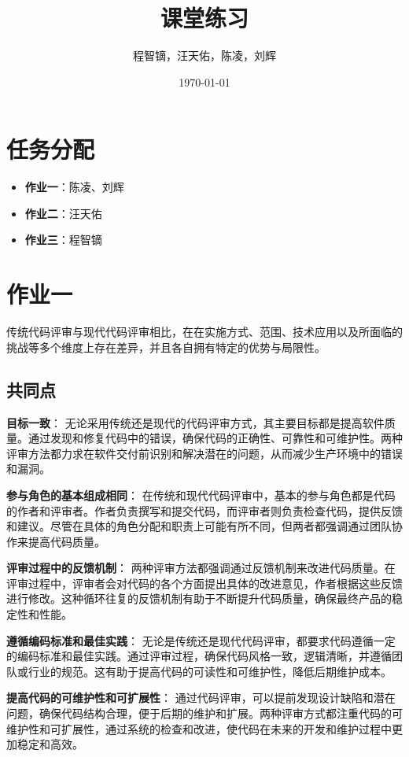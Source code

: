 \documentclass{article}
\title{课堂练习}
\author{程智镝，汪天佑，陈凌，刘辉}
\date{\today}
\begin{document}
\maketitle
\section*{任务分配}
\begin{itemize}
    \item \textbf{作业一}：陈凌、刘辉
    \item \textbf{作业二}：汪天佑
    \item \textbf{作业三}：程智镝
\end{itemize}


\section{作业一}
传统代码评审与现代代码评审相比，在在实施方式、范围、技术应用以及所面临的挑战等多个维度上存在差异，并且各自拥有特定的优势与局限性。

\subsection{共同点}

\textbf{目标一致}：
无论采用传统还是现代的代码评审方式，其主要目标都是提高软件质量。通过发现和修复代码中的错误，确保代码的正确性、可靠性和可维护性。两种评审方法都力求在软件交付前识别和解决潜在的问题，从而减少生产环境中的错误和漏洞。

\textbf{参与角色的基本组成相同}：
在传统和现代代码评审中，基本的参与角色都是代码的作者和评审者。作者负责撰写和提交代码，而评审者则负责检查代码，提供反馈和建议。尽管在具体的角色分配和职责上可能有所不同，但两者都强调通过团队协作来提高代码质量。

\textbf{评审过程中的反馈机制}：
两种评审方法都强调通过反馈机制来改进代码质量。在评审过程中，评审者会对代码的各个方面提出具体的改进意见，作者根据这些反馈进行修改。这种循环往复的反馈机制有助于不断提升代码质量，确保最终产品的稳定性和性能。

\textbf{遵循编码标准和最佳实践}：
无论是传统还是现代代码评审，都要求代码遵循一定的编码标准和最佳实践。通过评审过程，确保代码风格一致，逻辑清晰，并遵循团队或行业的规范。这有助于提高代码的可读性和可维护性，降低后期维护成本。

\textbf{提高代码的可维护性和可扩展性}：
通过代码评审，可以提前发现设计缺陷和潜在问题，确保代码结构合理，便于后期的维护和扩展。两种评审方式都注重代码的可维护性和可扩展性，通过系统的检查和改进，使代码在未来的开发和维护过程中更加稳定和高效。
\end{document}
